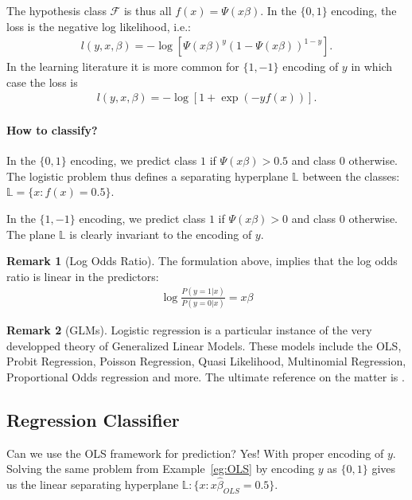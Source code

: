 \documentclass[12pt,a4paper]{article}
\theoremstyle{plain}
\theoremstyle{definition}
\newtheorem{remark}{Remark}
\newcommand{\loss}{l}
\newcommand{\hyp}{f}
\newcommand{\hypclass}{\mathcal{F}}
\newcommand{\plane}{\mathbb{L}}
\begin{document}
The hypothesis class $\hypclass$ is thus all $\hyp(x)=\Psi(x\beta)$.
In the $\{0,1\}$ encoding, the loss is the negative log likelihood, i.e.:
\begin{align}
	\loss(y,x,\beta) = -\log \left[ \Psi(x\beta)^{y} (1-\Psi(x\beta))^{1-y}  \right].
\end{align}
In the learning literature it is more common for $\{1,-1\}$ encoding of $y$ in which case the loss is 
\begin{align}
	\loss(y,x,\beta) = -\log \left[ 1+\exp(-y f(x))  \right].
\end{align}


\paragraph{How to classify?}
In the $\{0,1\}$ encoding, we predict class $1$ if $\Psi(x\beta)>0.5$ and class $0$ otherwise.
The logistic problem thus defines a separating hyperplane $\plane$ between the classes: $\plane=\{x:f(x)=0.5\}$.

In the $\{1,-1\}$ encoding, we predict class $1$ if $\Psi(x\beta)>0$ and class $0$ otherwise.
The plane $\plane$ is clearly invariant to the encoding of $y$.


\begin{remark}[Log Odds Ratio]
The formulation above, implies that the log odds ratio is linear in the predictors:
\begin{align*}
	\log \frac{P(y=1|x)}{P(y=0|x)} = x\beta
\end{align*}
\end{remark}



\begin{remark}[GLMs]
Logistic regression is a particular instance of the very developped theory of Generalized Linear Models.
These models include the OLS, Probit Regression, Poisson Regression, Quasi Likelihood, Multinomial Regression, Proportional Odds regression and more.
The ultimate reference on the matter is \cite{mccullagh_generalized_1989}.
\end{remark}




\subsection{Regression Classifier}
\label{sec:regression_classifier}
Can we use the OLS framework for prediction? Yes! With proper encoding of $y$.
Solving the same problem from Example~\ref{eg:OLS} by encoding $y$ as $\{0,1\}$ gives us the linear separating hyperplane $\plane: \{x:x\hat{\beta}_{OLS}=0.5\}$.
\end{document}
